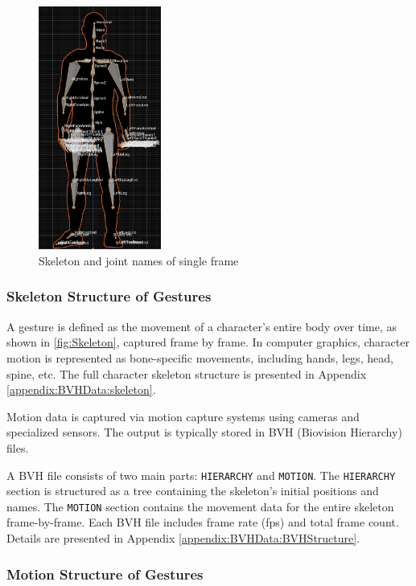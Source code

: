 \begin{figure}[h]
	\centering
	\includegraphics[height=8cm]{images/Skeleton.png}
	\caption{\small Skeleton and joint names of single frame}
	\label{fig:Skeleton}
\end{figure}

\subsubsection{Skeleton Structure of Gestures}

A gesture is defined as the movement of a character's entire body over time, as shown in \autoref{fig:Skeleton}, captured frame by frame. In computer graphics, character motion is represented as bone-specific movements, including hands, legs, head, spine, etc. The full character skeleton structure is presented in Appendix \autoref{appendix:BVHData:skeleton}.

Motion data is captured via motion capture systems using cameras and specialized sensors. The output is typically stored in BVH (Biovision Hierarchy) files.

A BVH file consists of two main parts: \texttt{HIERARCHY} and \texttt{MOTION}. The \texttt{HIERARCHY} section is structured as a tree containing the skeleton’s initial positions and names. The \texttt{MOTION} section contains the movement data for the entire skeleton frame-by-frame. Each BVH file includes frame rate (fps) and total frame count. Details are presented in Appendix \autoref{appendix:BVHData:BVHStructure}.

\subsubsection{Motion Structure of Gestures}

